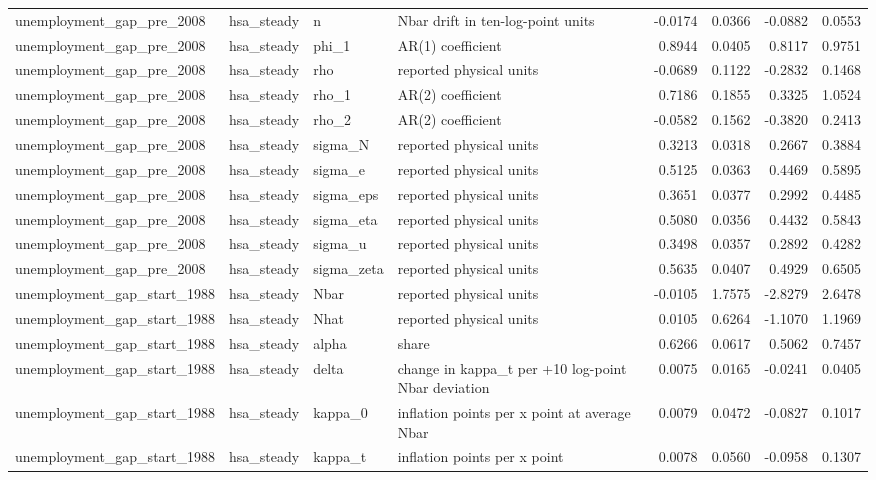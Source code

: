 \begin{tabular}{llllrrrr}
unemployment\_gap\_pre\_2008 & hsa\_steady & n & Nbar drift in ten-log-point units & -0.0174 & 0.0366 & -0.0882 & 0.0553 \\
unemployment\_gap\_pre\_2008 & hsa\_steady & phi\_1 & AR(1) coefficient & 0.8944 & 0.0405 & 0.8117 & 0.9751 \\
unemployment\_gap\_pre\_2008 & hsa\_steady & rho & reported physical units & -0.0689 & 0.1122 & -0.2832 & 0.1468 \\
unemployment\_gap\_pre\_2008 & hsa\_steady & rho\_1 & AR(2) coefficient & 0.7186 & 0.1855 & 0.3325 & 1.0524 \\
unemployment\_gap\_pre\_2008 & hsa\_steady & rho\_2 & AR(2) coefficient & -0.0582 & 0.1562 & -0.3820 & 0.2413 \\
unemployment\_gap\_pre\_2008 & hsa\_steady & sigma\_N & reported physical units & 0.3213 & 0.0318 & 0.2667 & 0.3884 \\
unemployment\_gap\_pre\_2008 & hsa\_steady & sigma\_e & reported physical units & 0.5125 & 0.0363 & 0.4469 & 0.5895 \\
unemployment\_gap\_pre\_2008 & hsa\_steady & sigma\_eps & reported physical units & 0.3651 & 0.0377 & 0.2992 & 0.4485 \\
unemployment\_gap\_pre\_2008 & hsa\_steady & sigma\_eta & reported physical units & 0.5080 & 0.0356 & 0.4432 & 0.5843 \\
unemployment\_gap\_pre\_2008 & hsa\_steady & sigma\_u & reported physical units & 0.3498 & 0.0357 & 0.2892 & 0.4282 \\
unemployment\_gap\_pre\_2008 & hsa\_steady & sigma\_zeta & reported physical units & 0.5635 & 0.0407 & 0.4929 & 0.6505 \\
unemployment\_gap\_start\_1988 & hsa\_steady & Nbar & reported physical units & -0.0105 & 1.7575 & -2.8279 & 2.6478 \\
unemployment\_gap\_start\_1988 & hsa\_steady & Nhat & reported physical units & 0.0105 & 0.6264 & -1.1070 & 1.1969 \\
unemployment\_gap\_start\_1988 & hsa\_steady & alpha & share & 0.6266 & 0.0617 & 0.5062 & 0.7457 \\
unemployment\_gap\_start\_1988 & hsa\_steady & delta & change in kappa\_t per +10 log-point Nbar deviation & 0.0075 & 0.0165 & -0.0241 & 0.0405 \\
unemployment\_gap\_start\_1988 & hsa\_steady & kappa\_0 & inflation points per x point at average Nbar & 0.0079 & 0.0472 & -0.0827 & 0.1017 \\
unemployment\_gap\_start\_1988 & hsa\_steady & kappa\_t & inflation points per x point & 0.0078 & 0.0560 & -0.0958 & 0.1307 \\

\end{tabular}
